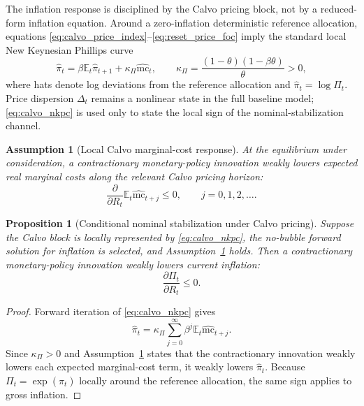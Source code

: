 ﻿\documentclass[12pt]{article}
\newtheorem{assumption}{Assumption}
\newtheorem{proposition}{Proposition}
\theoremstyle{remark}
\newcommand{\E}{\mathbb E}
\newcommand{\mc}{\mathrm{mc}}
\begin{document}
The inflation response is disciplined by the Calvo pricing block, not by a reduced-form inflation
equation. Around a zero-inflation deterministic reference allocation, equations
\eqref{eq:calvo_price_index}--\eqref{eq:reset_price_foc} imply the standard local New Keynesian
Phillips curve
\begin{equation}
    \widehat\pi_t
    =
    \beta\E_t\widehat\pi_{t+1}
    +
    \kappa_\Pi\widehat{\mc}_t,
    \qquad
    \kappa_\Pi
    =
    \frac{(1-\theta)(1-\beta\theta)}{\theta}
    >
    0,
    \label{eq:calvo_nkpc}
\end{equation}
where hats denote log deviations from the reference allocation and
$\widehat\pi_t=\log\Pi_t$. Price dispersion $\Delta_t$ remains a nonlinear state in the full
baseline model; \eqref{eq:calvo_nkpc} is used only to state the local sign of the
nominal-stabilization channel.

\begin{assumption}[Local Calvo marginal-cost response]\label{ass:calvo_mc_response}
At the equilibrium under consideration, a contractionary monetary-policy innovation weakly lowers
expected real marginal costs along the relevant Calvo pricing horizon:
\begin{equation}
    \frac{\partial}{\partial R_t}
    \E_t\widehat{\mc}_{t+j}
    \le 0,
    \qquad
    j=0,1,2,\ldots.
    \label{eq:mc_path_R_negative}
\end{equation}
\end{assumption}

\begin{proposition}[Conditional nominal stabilization under Calvo pricing]\label{prop:calvo_inflation_response}
Suppose the Calvo block is locally represented by \eqref{eq:calvo_nkpc}, the no-bubble forward
solution for inflation is selected, and Assumption~\ref{ass:calvo_mc_response} holds. Then a
contractionary monetary-policy innovation weakly lowers current inflation:
\begin{equation}
    \frac{\partial \Pi_t}{\partial R_t}\le 0.
    \label{eq:Pi_R_negative_calvo}
\end{equation}
\end{proposition}

\begin{proof}
Forward iteration of \eqref{eq:calvo_nkpc} gives
\begin{equation}
    \widehat\pi_t
    =
    \kappa_\Pi
    \sum_{j=0}^{\infty}
    \beta^j
    \E_t\widehat{\mc}_{t+j}.
    \label{eq:calvo_forward_solution}
\end{equation}
Since $\kappa_\Pi>0$ and Assumption~\ref{ass:calvo_mc_response} states that the contractionary
innovation weakly lowers each expected marginal-cost term, it weakly lowers
$\widehat\pi_t$. Because $\Pi_t=\exp(\widehat\pi_t)$ locally around the reference allocation, the
same sign applies to gross inflation.
\end{proof}
\end{document}

